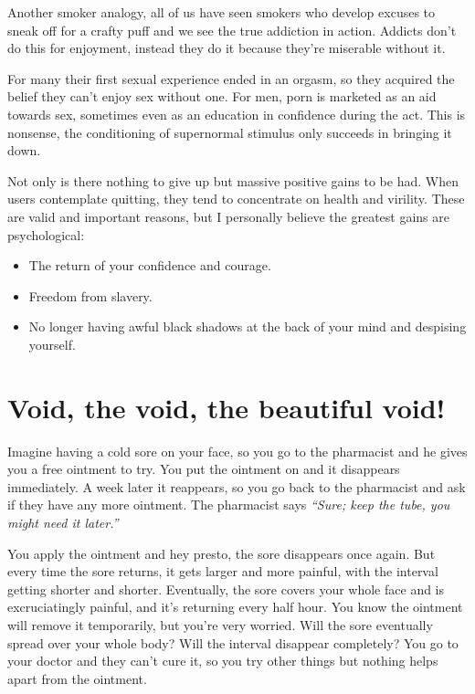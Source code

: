 \documentclass[
]{book}
\begin{document}
Another smoker analogy, all of us have seen smokers who develop excuses to sneak off for a crafty puff and we see the true addiction in action. Addicts don't do this for enjoyment, instead they do it because they're miserable without it.

For many their first sexual experience ended in an orgasm, so they acquired the belief they can't enjoy sex without one. For men, porn is marketed as an aid towards sex, sometimes even as an education in confidence during the act. This is nonsense, the conditioning of supernormal stimulus only succeeds in bringing it down.

Not only is there nothing to give up but massive positive gains to be had. When users contemplate quitting, they tend to concentrate on health and virility. These are valid and important reasons, but I personally believe the greatest gains are psychological:

\begin{itemize}
\item
  The return of your confidence and courage.
\item
  Freedom from slavery.
\item
  No longer having awful black shadows at the back of your mind and despising yourself.
\end{itemize}

\hypertarget{void-the-void-the-beautiful-void}{%
\section{Void, the void, the beautiful void!}\label{void-the-void-the-beautiful-void}}

Imagine having a cold sore on your face, so you go to the pharmacist and he gives you a free ointment to try. You put the ointment on and it disappears immediately. A week later it reappears, so you go back to the pharmacist and ask if they have any more ointment. The pharmacist says \emph{``Sure; keep the tube, you might need it later.''}

You apply the ointment and hey presto, the sore disappears once again. But every time the sore returns, it gets larger and more painful, with the interval getting shorter and shorter. Eventually, the sore covers your whole face and is excruciatingly painful, and it's returning every half hour. You know the ointment will remove it temporarily, but you're very worried. Will the sore eventually spread over your whole body? Will the interval disappear completely? You go to your doctor and they can't cure it, so you try other things but nothing helps apart from the ointment.
\end{document}
